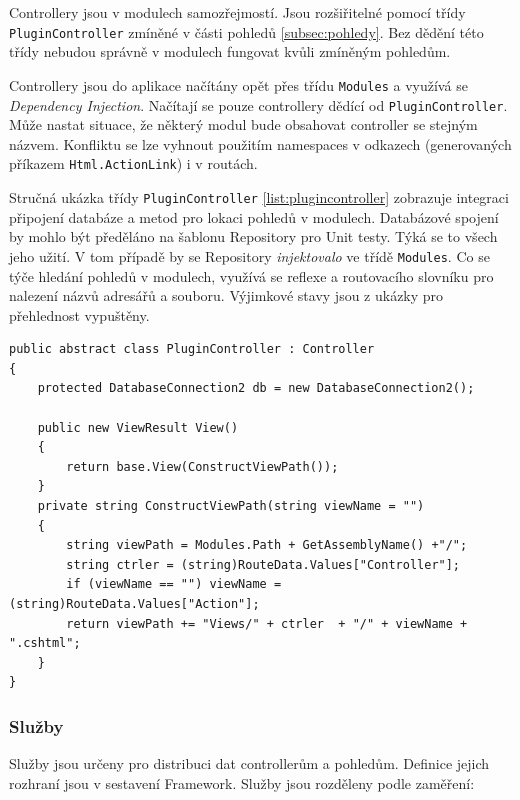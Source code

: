 \documentclass[11pt,twoside,a4paper]{book}
\begin{document}
Controllery jsou v modulech samozřejmostí. Jsou rozšiřitelné pomocí třídy \texttt{PluginController} zmíněné v části pohledů \ref{subsec:pohledy}. Bez dědění této třídy nebudou správně v modulech fungovat kvůli zmíněným pohledům.

Controllery jsou do aplikace načítány opět přes třídu \texttt{Modules} a využívá se \textit{Dependency Injection}. Načítají se pouze controllery dědící od \texttt{PluginController}. Může nastat situace, že některý modul bude obsahovat controller se stejným názvem. Konfliktu se lze vyhnout použitím namespaces v odkazech (generovaných příkazem \texttt{Html.ActionLink}) i v routách.

Stručná ukázka třídy \texttt{PluginController} \ref{list:plugincontroller} zobrazuje integraci připojení databáze a metod pro lokaci pohledů v modulech. Databázové spojení by mohlo být předěláno na šablonu Repository pro Unit testy. Týká se to všech jeho užití. V tom případě by se Repository \textit{injektovalo} ve třídě \texttt{Modules}. Co se týče hledání pohledů v modulech, využívá se reflexe a routovacího slovníku pro nalezení názvů adresářů a souboru. Výjimkové stavy jsou z ukázky pro přehlednost vypuštěny.

\begin{lstlisting}[float=h!,language=CSharp, caption={třída PluginController}, label=list:plugincontroller]
public abstract class PluginController : Controller
{
	protected DatabaseConnection2 db = new DatabaseConnection2();

    public new ViewResult View()
    {
        return base.View(ConstructViewPath());
    }
    private string ConstructViewPath(string viewName = "")
    {
        string viewPath = Modules.Path + GetAssemblyName() +"/";
        string ctrler = (string)RouteData.Values["Controller"];
        if (viewName == "") viewName = (string)RouteData.Values["Action"];
        return viewPath += "Views/" + ctrler  + "/" + viewName + ".cshtml";
    }   
}
\end{lstlisting}

\subsubsection{Služby}
\label{sec:services}
Služby jsou určeny pro distribuci dat controllerům a pohledům. Definice jejich rozhraní jsou v sestavení Framework. Služby jsou rozděleny podle zaměření:
\end{document}
